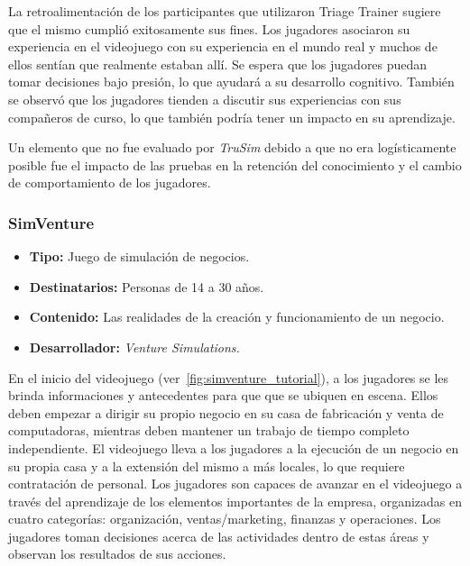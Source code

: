 La retroalimentación de los participantes que utilizaron Triage Trainer sugiere
que el mismo cumplió exitosamente sus fines. Los jugadores asociaron su
experiencia en el videojuego con su experiencia en el mundo real y muchos de ellos
sentían que realmente estaban allí. Se espera que los jugadores puedan tomar
decisiones bajo presión, lo que ayudará a su desarrollo cognitivo. También se
observó que los jugadores tienden a discutir sus experiencias con sus compañeros
de curso, lo que también podría tener un impacto en su aprendizaje.

Un elemento que no fue evaluado por \emph{TruSim} debido a que no era
logísticamente posible fue el impacto de las pruebas en la retención del
conocimiento y el cambio de comportamiento de los
jugadores\cite{education:games}. 


\subsubsection{SimVenture}

\begin{itemize}
\item \textbf{Tipo:} Juego de simulación de negocios.
\item \textbf{Destinatarios:} Personas de 14 a 30 años.
\item \textbf{Contenido:} Las realidades de la creación y funcionamiento de un
    negocio.
\item \textbf{Desarrollador:} \emph{Venture Simulations.}
\end{itemize}

En el inicio del videojuego (ver~\ref{fig:simventure_tutorial}), a los jugadores se
les brinda informaciones y antecedentes para que que se ubiquen en escena. Ellos
deben empezar a dirigir su propio negocio en su casa de fabricación y venta de
computadoras, mientras deben mantener un trabajo de tiempo completo
independiente. El videojuego lleva a los jugadores a la ejecución de un negocio en su
propia casa y a la extensión del mismo a más locales, lo que requiere
contratación de personal. Los jugadores son capaces de avanzar en el videojuego a
través del aprendizaje de los elementos importantes de la empresa, organizadas
en cuatro categorías: organización, ventas/marketing, finanzas y operaciones.
Los jugadores toman decisiones acerca de las actividades dentro de estas áreas y
observan los resultados de sus acciones. 

